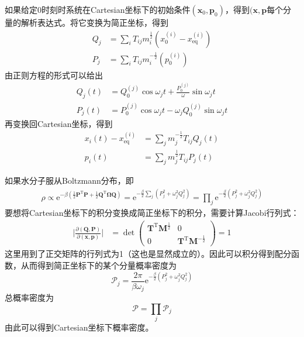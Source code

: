     \splitline

    如果给定0时刻时系统在Cartesian坐标下的初始条件$(\bm{x}_0,\bm{p}_0)$，得到$(\bm{x},\bm{p}$每个分量的解析表达式。将它变换为简正坐标，得到
    \begin{equation}\begin{aligned}
        Q_j &= \sum_i T_{ij} m_i^{\frac 12} (x_0^{(i)} - x_\mathrm{eq}^{(i)})\\
        P_j &= \sum_i T_{ij} m_i^{-\frac 12} (p_0^{(i)})
    \end{aligned}\end{equation}
    由正则方程的形式可以给出
    \begin{equation}\begin{aligned}
        Q_j(t) &= Q_0^{(j)}\cos{\omega_j t} + \frac {P_0^{(j)}}{\omega} \sin{\omega_j t}\\
        P_j(t) &= P_0^{(j)}\cos{\omega_j t} - \omega_j Q_0^{(j)} \sin{\omega_j t}
    \end{aligned}\end{equation}
    再变换回Cartesian坐标，得到
    \begin{equation}\begin{aligned}
        x_i(t) - x_\mathrm{eq}^{(i)} &= \sum_j m_j^{-\frac 12} T_{ij} Q_j(t)\\
        p_i(t) &= \sum_j m_j^{\frac 12} T_{ij}P_j(t)
    \end{aligned}\end{equation}

    如果水分子服从Boltzmann分布，即
    \begin{equation}\begin{aligned}
        \rho \propto \mathrm{e}^{-\beta (\frac 12 \bm{P}^\mathrm{T}\bm{P} + \frac 12 \bm{Q}^\mathrm{T} \bm{\Omega Q})} = \mathrm{e}^{- \frac {\beta}2 \sum_j (P_j^2 + \omega_j^2 Q_j^2)} = \prod_j \mathrm{e}^{-\frac {\beta}2 (P_j^2 + \omega_j^2 Q_j^2)}
    \end{aligned}\end{equation}
    要想将Cartesian坐标下的积分变换成简正坐标下的积分，需要计算Jacobi行列式：
    \begin{equation}\begin{aligned}
        \bigg|\frac {\partial (\bm{Q,P})}{\partial (\bm{x,p})}\bigg| &= \det
        \begin{pmatrix}
            \bm{T}^\mathrm{T}\bm{M}^{\frac 12} & 0\\
            0 & \bm{T}^\mathrm{T}\bm{M}^{-\frac 12}
        \end{pmatrix}
        = 1
    \end{aligned}\end{equation}
    这里用到了正交矩阵的行列式为1（这也是显然成立的）。因此可以积分得到配分函数，从而得到简正坐标下的某个分量概率密度为
    \begin{equation}
        \mathcal{P}_j = \frac {2\pi}{\beta\omega_j} \mathrm{e}^{-\frac {\beta}2 (P_j^2 + \omega_j^2 Q_j^2)}
    \end{equation}
    总概率密度为
    \begin{equation}
        \mathcal{P} = \prod_j \mathcal{P}_j
    \end{equation}
    由此可以得到Cartesian坐标下概率密度。

